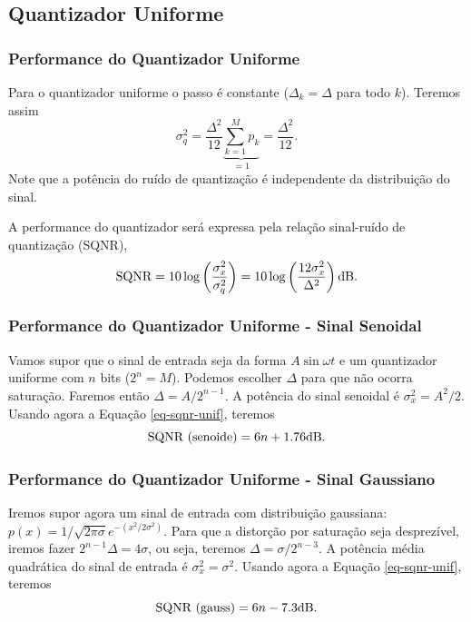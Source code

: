 \subsection{Quantizador Uniforme}
\begin{frame}[allowframebreaks]
  \frametitle{Performance do Quantizador Uniforme} 

  Para o quantizador uniforme o passo é constante ($\Delta_k = \Delta$ para todo $k$). Teremos assim
  \begin{equation} \label{eq-sqnr-quants-uni}
  \sigma_q^2 = \frac{\Delta^2}{12} \underbrace{ \sum_{k=1}^{M} p_k }_{=1} = \frac{\Delta^2}{12} .
  \end{equation}
  Note que a potência do ruído de quantização é independente da distribuição do sinal.

  A performance do quantizador será expressa pela relação sinal-ruído de quantização (SQNR),
  \begin{equation} \label{eq-sqnr-unif}
  \textmd{SQNR} = 10 \log \left( \frac{\sigma_x^2}{\sigma_q^2} \right) = 10 \log \left( \frac{12 \sigma_x^2}{\Delta^2} \right) \mathrm{dB}.
  \end{equation}
\end{frame}

\begin{frame}[allowframebreaks]
  \frametitle{Performance do Quantizador Uniforme - Sinal Senoidal}
  Vamos supor que o sinal de entrada seja da forma $A \sin \omega t$ e 
  um quantizador uniforme com $n$ bits ($2^n = M$). Podemos escolher $\Delta$
  para que não ocorra saturação. Faremos então $\Delta = A/2^{n-1}$.
  A potência do sinal senoidal é $\sigma_x^2 = A^2/2$. Usando agora a Equação \ref{eq-sqnr-unif}, teremos
  \begin{equation} \label{eq-sqnr-unif-sin}
  \textmd{SQNR (senoide)}  = 6n + 1.76 \mathrm{dB}.
  \end{equation}
\end{frame}

\begin{frame}[allowframebreaks]
  \frametitle{Performance do Quantizador Uniforme - Sinal Gaussiano}
  Iremos supor agora um sinal de entrada com distribuição gaussiana: $p(x)=1/\sqrt{2\pi\sigma} e^{-(x^2/2\sigma^2)}$.
  Para que a distorção por saturação seja desprezível, iremos fazer $2^{n-1} \Delta = 4 \sigma$, ou seja, teremos $\Delta = \sigma/2^{n-3}$.
  A potência média quadrática do sinal de entrada é $\sigma_x^2 = \sigma^2$. Usando agora a Equação \ref{eq-sqnr-unif}, teremos
  \begin{equation} \label{eq-sqnr-unif-gaus}
  \textmd{SQNR (gauss)}  = 6n - 7.3 \mathrm{dB}.
  \end{equation}
\end{frame}


